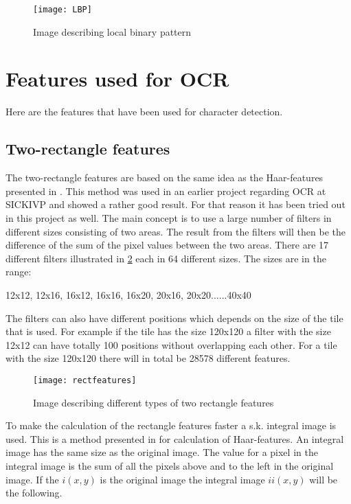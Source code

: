 \begin{figure}[H]
\centering
	\texttt{[image: LBP]}
	\caption{Image describing local binary pattern}
	\label{LBP}
\end{figure}

\section{Features used for OCR}
\label{sec:Features used for OCR}
Here are the features that have been used for character detection.

\subsection{Two-rectangle features}
\label{sec:Two-rectangle features}
The two-rectangle features are based on the same idea as the Haar-features presented in \citep{Viola:2010}. This method was used in an earlier project regarding OCR at SICKIVP and showed a rather good result. For that reason it has been tried out in this project as well. The main concept is to use a large number of filters in different sizes consisting of two areas. The result from the filters will then be the difference of the sum of the pixel values between the two areas. There are 17 different filters illustrated in \ref{Two-rectangle} each in 64 different sizes. The sizes are in the range:
\begin{center}
	12x12, 12x16, 16x12, 16x16, 16x20, 20x16, 20x20......40x40
\end{center}
The filters can also have different positions which depends on the size of the tile that is used. For example if the tile has the size 120x120 a filter with the size 12x12 can have totally 100 positions without overlapping each other. For a tile with the size 120x120 there will in total be 28578 different features.  
\begin{figure}[H]
\centering
	\texttt{[image: rectfeatures]}
	\caption{Image describing different types of two rectangle features}
	\label{Two-rectangle}
\end{figure}

To make the calculation of the rectangle features faster a s.k. integral image is used. This is a method presented in \citep{Viola:2010} for calculation of Haar-features. An integral image has the same size as the original image. The value for a pixel in the integral image is the sum of all the pixels above and to the left in the original image. If the $i(x,y)$ is the original image the integral image $ii(x,y)$ will be the following.

